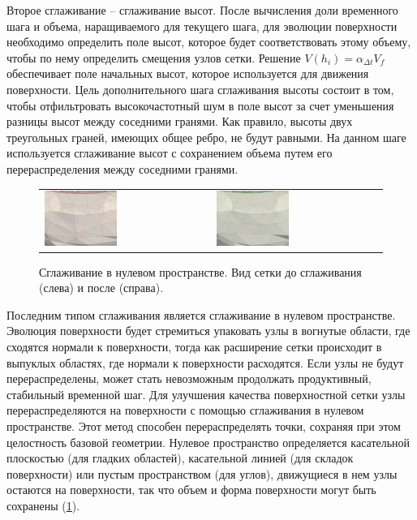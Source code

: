 Второе сглаживание -- сглаживание высот.
После вычисления доли временного шага и объема, наращиваемого для текущего шага, для эволюции поверхности необходимо определить поле высот, которое будет соответствовать этому объему, чтобы по нему определить смещения узлов сетки.
Решение $V(h_i) = \alpha_{\Delta t} V_f$ обеспечивает поле начальных высот, которое используется для движения поверхности.
Цель дополнительного шага сглаживания высоты состоит в том, чтобы отфильтровать высокочастотный шум в поле высот за счет уменьшения разницы высот между соседними гранями.
Как правило, высоты двух треугольных граней, имеющих общее ребро, не будут равными.
На данном шаге используется сглаживание высот с сохранением объема путем его перераспределения между соседними гранями.

\begin{figure}[h]
\centering
\begin{tabular}{ll}
\includegraphics[width=0.45\textwidth]{pics/text_1_remesh_3d/pic_smooth_before.png}
&
\includegraphics[width=0.45\textwidth]{pics/text_1_remesh_3d/pic_smooth_after.png}
\end{tabular}
\caption{Сглаживание в нулевом пространстве. Вид сетки до сглаживания (слева) и после (справа).}
\label{fig:text_1_remesh3_tong_smooth}
\end{figure}

Последним типом сглаживания является сглаживание в нулевом пространстве.
Эволюция поверхности будет стремиться упаковать узлы в вогнутые области, где сходятся нормали к поверхности, тогда как расширение сетки происходит в выпуклых областях, где нормали к поверхности расходятся.
Если узлы не будут перераспределены, может стать невозможным продолжать продуктивный, стабильный временной шаг.
Для улучшения качества поверхностной сетки узлы перераспределяются на поверхности с помощью сглаживания в нулевом пространстве.
Этот метод способен перераспределять точки, сохраняя при этом целостность базовой геометрии.
Нулевое пространство определяется касательной плоскостью (для гладких областей), касательной линией (для складок поверхности) или пустым пространством (для углов), движущиеся в нем узлы остаются на поверхности, так что объем и форма поверхности могут быть сохранены (\ref{fig:text_1_remesh3_tong_smooth}).
